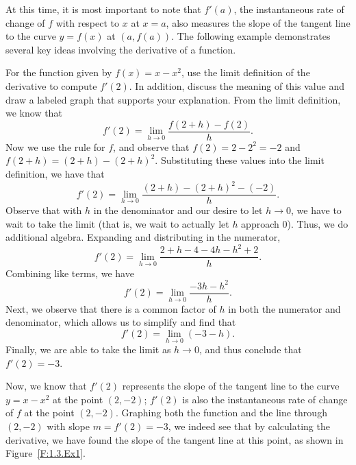 At this time, it is most important to note that $f'(a)$, the instantaneous rate of change of $f$ with respect to $x$ at $x = a$, also measures the slope of the tangent line to the curve $y = f(x)$ at $(a,f(a))$.  The following example demonstrates several key ideas involving the derivative of a function.

\bex
For the function given by $f(x) = x - x^2$, use the limit definition of the derivative to compute $f'(2)$.  In addition, discuss the meaning of this value and draw a labeled graph that supports your explanation. 
\eex
From the limit definition, we know that
$$f'(2) = \lim_{h \to 0} \frac{f(2+h)-f(2)}{h}.$$
Now we use the rule for $f$, and observe that $f(2) = 2 - 2^2 = -2$ and $f(2+h) = (2+h) - (2+h)^2.$  Substituting these values into the limit definition, we have that
$$f'(2) = \lim_{h \to 0} \frac{(2+h) - (2+h)^2 -  (-2)}{h}.$$
Observe that with $h$ in the denominator and our desire to let $h \to 0$, we have to wait to take the limit (that is, we wait to actually let $h$ approach 0).  Thus, we do additional algebra.  Expanding and distributing in the numerator,
$$f'(2) = \lim_{h \to 0} \frac{2+h - 4 - 4h - h^2 + 2}{h}.$$
Combining like terms, we have
$$f'(2) = \lim_{h \to 0} \frac{ -3h - h^2}{h}.$$
Next, we observe that there is a common factor of $h$ in both the numerator and denominator, which allows us to simplify and find that
$$f'(2) = \lim_{h \to 0} (-3-h).$$
Finally, we are able to take the limit as $h \to 0$, and thus conclude that $f'(2) = -3$.

Now, we know that $f'(2)$ represents the slope of the tangent line to the curve $y = x - x^2$ at the point $(2,-2)$; $f'(2)$ is also the instantaneous rate of change of $f$ at the point $(2,-2)$.  Graphing both the function and the line through $(2,-2)$ with slope $m = f'(2) = -3$, we indeed see that by calculating the derivative, we have found the slope of the tangent line at this point, as shown in Figure~\ref{F:1.3.Ex1}.

